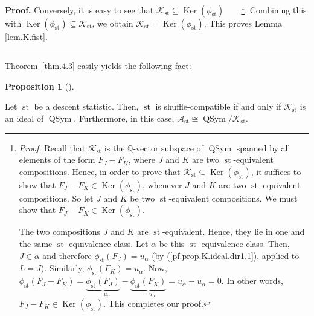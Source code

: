 \documentclass[numbers=enddot,12pt,final,onecolumn,notitlepage]{scrartcl}%
\theoremstyle{definition}
\newtheorem{prop}[theo]{Proposition}
\newenvironment{proposition}[1][]
{\begin{prop}[#1]\begin{leftbar}}
{\end{leftbar}\end{prop}}
\newenvironment{proof}[1][Proof]{\noindent\textbf{#1.} }{\ \rule{0.5em}{0.5em}}
\newenvironment{verlong}{}{}
\begin{document}
\begin{verlong}
\begin{proof}
Conversely, it is easy to see that $\mathcal{K}_{\operatorname*{st}}%
\subseteq\operatorname*{Ker}\left(  \phi_{\operatorname*{st}}\right)
$\ \ \ \ \footnote{\textit{Proof.} Recall that $\mathcal{K}%
_{\operatorname*{st}}$ is the $\mathbb{Q}$-vector subspace of
$\operatorname*{QSym}$ spanned by all elements of the form $F_{J}-F_{K}$,
where $J$ and $K$ are two $\operatorname*{st}$-equivalent compositions. Hence,
in order to prove that $\mathcal{K}_{\operatorname*{st}}\subseteq
\operatorname*{Ker}\left(  \phi_{\operatorname*{st}}\right)  $, it suffices to
show that $F_{J}-F_{K}\in\operatorname*{Ker}\left(  \phi_{\operatorname*{st}%
}\right)  $, whenever $J$ and $K$ are two $\operatorname*{st}$-equivalent
compositions. So let $J$ and $K$ be two $\operatorname*{st}$-equivalent
compositions. We must show that $F_{J}-F_{K}\in\operatorname*{Ker}\left(
\phi_{\operatorname*{st}}\right)  $.
\par
The two compositions $J$ and $K$ are $\operatorname*{st}$-equivalent. Hence,
they lie in one and the same $\operatorname*{st}$-equivalence class. Let
$\alpha$ be this $\operatorname*{st}$-equivalence class. Then, $J\in\alpha$
and therefore $\phi_{\operatorname*{st}}\left(  F_{J}\right)  =u_{\alpha}$ (by
(\ref{pf.prop.K.ideal.dir1.1}), applied to $L=J$). Similarly, $\phi
_{\operatorname*{st}}\left(  F_{K}\right)  =u_{\alpha}$. Now, $\phi
_{\operatorname*{st}}\left(  F_{J}-F_{K}\right)  =\underbrace{\phi
_{\operatorname*{st}}\left(  F_{J}\right)  }_{=u_{\alpha}}-\underbrace{\phi
_{\operatorname*{st}}\left(  F_{K}\right)  }_{=u_{\alpha}}=u_{\alpha
}-u_{\alpha}=0$. In other words, $F_{J}-F_{K}\in\operatorname*{Ker}\left(
\phi_{\operatorname*{st}}\right)  $. This completes our proof.}. Combining
this with $\operatorname*{Ker}\left(  \phi_{\operatorname*{st}}\right)
\subseteq\mathcal{K}_{\operatorname*{st}}$, we obtain $\mathcal{K}%
_{\operatorname*{st}}=\operatorname*{Ker}\left(  \phi_{\operatorname*{st}%
}\right)  $. This proves Lemma \ref{lem.K.fist}.
\end{proof}
\end{verlong}

Theorem~\ref{thm.4.3} easily yields the following fact:

\begin{proposition}
\label{prop.K.ideal}Let $\operatorname*{st}$ be a descent statistic. Then,
$\operatorname*{st}$ is shuffle-compatible if and only if $\mathcal{K}%
_{\operatorname*{st}}$ is an ideal of $\operatorname*{QSym}$. Furthermore, in
this case, $\mathcal{A}_{\operatorname*{st}}\cong\operatorname*{QSym}%
/\mathcal{K}_{\operatorname*{st}}$.
\end{proposition}
\end{document}
